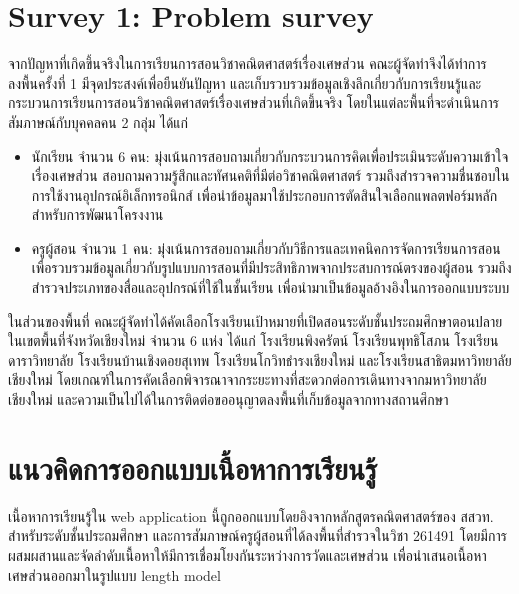 \section{Survey 1: Problem survey}
จากปัญหาที่เกิดขึ้นจริงในการเรียนการสอนวิชาคณิตศาสตร์เรื่องเศษส่วน คณะผู้จัดทำจึงได้ทำการลงพื้นครั้งที่ 1 มีจุดประสงค์เพื่อยืนยันปัญหา
และเก็บรวบรวมข้อมูลเชิงลึกเกี่ยวกับการเรียนรู้และกระบวนการเรียนการสอนวิชาคณิตศาสตร์เรื่องเศษส่วนที่เกิดขึ้นจริง โดยในแต่ละพื้นที่จะดำเนินการสัมภาษณ์กับบุคคลคน 2 กลุ่ม ได้แก่
\begin{itemize}
    \item นักเรียน จำนวน 6 คน: มุ่งเน้นการสอบถามเกี่ยวกับกระบวนการคิดเพื่อประเมินระดับความเข้าใจเรื่องเศษส่วน สอบถามความรู้สึกและทัศนคติที่มีต่อวิชาคณิตศาสตร์ รวมถึงสำรวจความชื่นชอบในการใช้งานอุปกรณ์อิเล็กทรอนิกส์ เพื่อนำข้อมูลมาใช้ประกอบการตัดสินใจเลือกแพลตฟอร์มหลักสำหรับการพัฒนาโครงงาน
    \item ครูผู้สอน จำนวน 1 คน: มุ่งเน้นการสอบถามเกี่ยวกับวิธีการและเทคนิคการจัดการเรียนการสอน เพื่อรวบรวมข้อมูลเกี่ยวกับรูปแบบการสอนที่มีประสิทธิภาพจากประสบการณ์ตรงของผู้สอน รวมถึงสำรวจประเภทของสื่อและอุปกรณ์ที่ใช้ในชั้นเรียน เพื่อนำมาเป็นข้อมูลอ้างอิงในการออกแบบระบบ
\end{itemize}

ในส่วนของพื้นที่ คณะผู้จัดทำได้คัดเลือกโรงเรียนเป้าหมายที่เปิดสอนระดับชั้นประถมศึกษาตอนปลายในเขตพื้นที่จังหวัดเชียงใหม่ จำนวน 6 แห่ง 
ได้แก่ โรงเรียนพิงครัตน์ โรงเรียนพุทธิโสภน โรงเรียนดาราวิทยาลัย โรงเรียนบ้านเชิงดอยสุเทพ โรงเรียนโกวิทธำรงเชียงใหม่ และโรงเรียนสาธิตมหาวิทยาลัยเชียงใหม่ 
โดยเกณฑ์ในการคัดเลือกพิจารณาจากระยะทางที่สะดวกต่อการเดินทางจากมหาวิทยาลัยเชียงใหม่ และความเป็นไปได้ในการติดต่อขออนุญาตลงพื้นที่เก็บข้อมูลจากทางสถานศึกษา

\section{แนวคิดการออกแบบเนื้อหาการเรียนรู้}
เนื้อหาการเรียนรู้ใน web application นี้ถูกออกแบบโดยอิงจากหลักสูตรคณิตศาสตร์ของ สสวท. สำหรับระดับชั้นประถมศึกษา และการสัมภาษณ์ครูผู้สอนที่ได้ลงพื้นที่สำรวจในวิชา 261491
โดยมีการผสมผสานและจัดลำดับเนื้อหาให้มีการเชื่อมโยงกันระหว่างการวัดและเศษส่วน เพื่อนำเสนอเนื้อหาเศษส่วนออกมาในรูปแบบ length model

